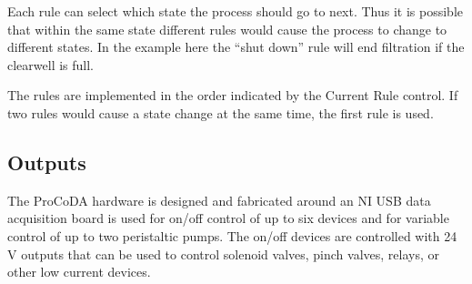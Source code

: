 \documentclass[letterpaper,10pt,english]{sphinxmanual}
\begin{document}
Each rule can select which state the process should go to next. Thus it is possible that within the same state different rules would cause the process to change to different states. In the example here the “shut down” rule will end filtration if the clearwell is full.

The rules are implemented in the order indicated by the Current Rule control. If two rules would cause a state change at the same time, the first rule is used.


\subsection{Outputs}
\label{\detokenize{ProCoDA/ProCoDA:outputs}}\label{\detokenize{ProCoDA/ProCoDA:heading-procoda-outputs}}
The ProCoDA hardware is designed and fabricated around an NI USB data acquisition board is used for on/off control of up to six devices and for variable control of up to two peristaltic pumps. The on/off devices are controlled with 24 V outputs that can be used to control solenoid valves, pinch valves, relays, or other low current devices.
\end{document}
